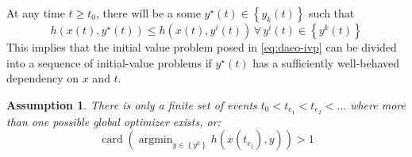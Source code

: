\documentclass[twoside,leqno, twocolumn]{article}
\DeclareMathOperator*{\argmin}{\arg\min}
\DeclareMathOperator{\card}{\mathrm{card}}
\newtheorem{assumption}{Assumption}[section]
\begin{document}
At any time $t \geq t_0$, there will be a some $y^\star(t)\in\left\{y_k(t)\right\}$ such that
\begin{equation}
	h(x(t), y^\star(t))\leq h(x(t),y^i(t))\, \forall\,y^i(t)\in\left\{y^k(t)\right\} 
\end{equation}
This implies that the initial value problem posed in \eqref{eq:daeo-ivp} can be divided into a sequence of initial-value problems if $y^\star(t)$ has a sufficiently well-behaved dependency on $x$ and $t$.

\begin{assumption}
	\label{assume:events-exist}
	There is only a finite set of events $t_0 < t_{e_1} < t_{e_2} < \ldots$ where more than one possible global optimizer exists, or:
	\begin{equation*}
		\card\left(\argmin_{y\in\left\{y^k\right\}}h(x(t_{e_j}), y)\right) > 1
	\end{equation*}
\end{assumption}
\end{document}
